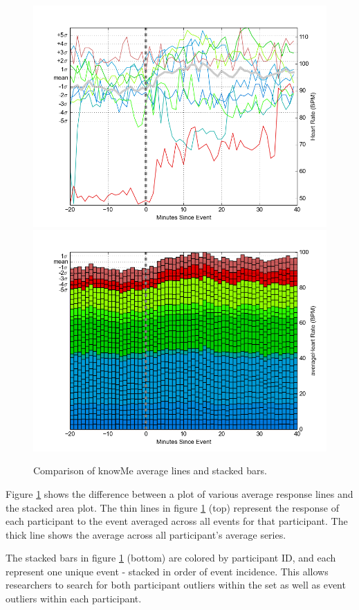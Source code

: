 \documentclass[review,journal]{vgtc}         %
\begin{document}
\begin{figure}
\centering
\includegraphics[width=0.9\columnwidth]{./img/knowMe_60m_lines.png}
\includegraphics[width=0.9\columnwidth]{./img/knowMe_60m_bars.png}
\caption{Comparison of knowMe average lines and stacked bars.}
\label{fig:knowMeCompare}
\end{figure}

Figure \ref{fig:knowMeCompare} shows the difference between a plot of various average response lines and the stacked area plot.
The thin lines in figure \ref{fig:knowMeCompare} (top) represent the response of each participant to the event averaged across all events for that participant.
The thick line shows the average across all participant’s average series.

The stacked bars in figure \ref{fig:knowMeCompare} (bottom) are colored by participant ID, and each represent one unique event - stacked in order of event incidence.
This allows researchers to search for both participant outliers within the set as well as event outliers within each participant.
\end{document}
